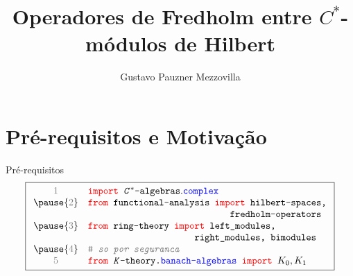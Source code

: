 \documentclass[handout, 9pt, compress]{beamer}
\title{Operadores de Fredholm entre \texorpdfstring{\ensuremath{C^*}}{C*}-módulos de Hilbert}
\author{Gustavo Pauzner Mezzovilla}
\date{}
\begin{document}
{ 
\begin{frame}
    \maketitle
\end{frame}
\usebackgroundtemplate{}

\section{Pré-requisitos e Motivação}
\begin{frame}{Pré-requisitos}
    \[\boxed{\begin{array}{cl}
       {\footnotesize \textcolor{gray}{1}} & \texttt{\textcolor{red}{import} \textit{C}$^*$-algebras}.\textcolor{blue}{\texttt{complex}} \\
       \pause
       {\footnotesize \textcolor{gray}{2}} &\texttt{\textcolor{red}{from} functional-analysis \textcolor{red}{import} hilbert-spaces,} \\
       & \hphantom{\texttt{\textcolor{red}{from} functional-analysis \textcolor{red}{imp}}}\texttt{fredholm-operators}\\ \pause

       {\footnotesize \textcolor{gray}{3}} & \texttt{\textcolor{red}{from} ring-theory \textcolor{red}{import} left\_modules,}\\ 
       & \hphantom{\texttt{\textcolor{red}{from} ring-theory \textcolor{red}{impo}}}\texttt{right\_modules, bimodules} \\\pause
       {\footnotesize \textcolor{gray}{4}} & \textcolor{gray}{\texttt{\# \textit{so por seguranca}}} \\
       {\footnotesize \textcolor{gray}{5}} & \texttt{\textcolor{red}{from} \textit{K}-theory.\textcolor{blue}{banach-algebras} \textcolor{red}{import} $K_0, K_1$} \\
        \end{array}}\]
\end{frame}

}
\end{document}
